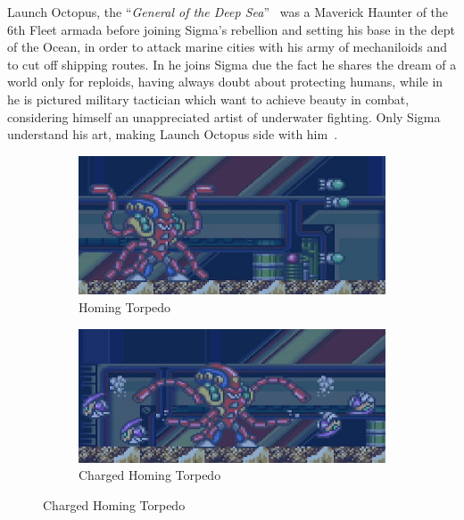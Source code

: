 Launch Octopus, the ``\textit{General of the Deep Sea}''~\cite{book:MMX_Complete_art} was a Maverick Haunter of the 6th Fleet armada before joining Sigma's rebellion and setting his base in the dept of the Ocean, in order to attack marine cities with his army of mechaniloids and to cut off shipping routes. In \x he joins Sigma due the fact he shares the dream of a world only for reploids, having always doubt about protecting humans, while in \mhx he is pictured military tactician which want to achieve beauty in combat, considering himself an unappreciated artist of underwater fighting. Only Sigma understand his art, making Launch Octopus side with him~\cite{wiki:MM_MHX_script}.

\begin{figure}[htp]
	\centering
	\begin{subfigure}{0.48\textwidth}
		\centering
		\includegraphics[width=\linewidth]{figures/X1/Launch_octopus/Octopus_missile.jpg}
		\caption{Homing Torpedo}
	\end{subfigure}
	\begin{subfigure}{0.49\textwidth}
		\centering
		\includegraphics[width=\linewidth]{figures/X1/Launch_octopus/Octopus_piranha.jpg}
		\caption{Charged Homing Torpedo}
	\end{subfigure}
	\end{figure}

